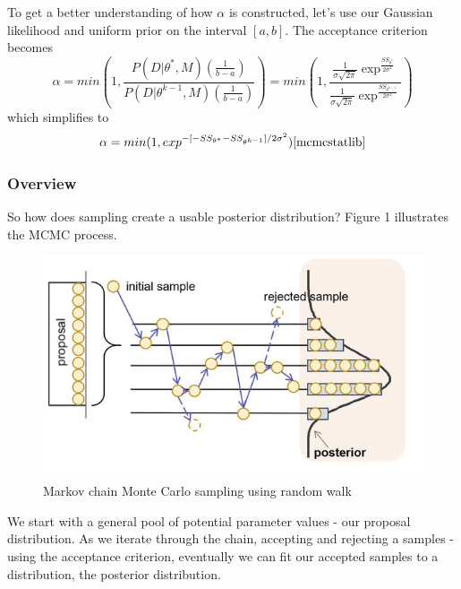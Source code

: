 \documentclass{article}
\begin{document}
\par To get a better understanding of how $\alpha$ is constructed, let's use our Gaussian likelihood and uniform prior on the interval $[a, b]$. The acceptance criterion becomes
\begin{equation} \label{eq:11mcmc}
\alpha = min(1, \frac{P(D|\theta^*, M)(\frac{1}{b-a})}{P(D|\theta^{k-1},M)(\frac{1}{b-a})}) = min(1, \frac{\frac{1}{\sigma \sqrt{2\pi}} \exp^{\frac{SS_{\theta^*}}{{2\sigma^2}}}}{\frac{1}{\sigma \sqrt{2\pi}} \exp^{\frac{SS_{\theta^{k-1}}}{{2\sigma^2}}}})
\end{equation}
which simplifies to
\begin{equation} \label{eq:12mcmc}
    \alpha = min(1, exp^{-[-SS_{\theta^*} - SS_{\theta^{k-1}}]/2\sigma^2}) \cite{mcmcstatlib}
\end{equation}
\subsubsection{Overview} So how does sampling create a usable posterior distribution? Figure 1 illustrates the MCMC process.
\begin{figure}[H]
    \centering
    \includegraphics[width=15cm]{MCMC_figs/mcmc_procedure.png}
    \caption{Markov chain Monte Carlo sampling using random walk \cite{mcmcFig}}
\end{figure}
We start with a general pool of potential parameter values - our proposal distribution. As we iterate through the chain, accepting and rejecting a samples - using the acceptance criterion, eventually we can fit our accepted samples to a distribution, the posterior distribution.
\end{document}
